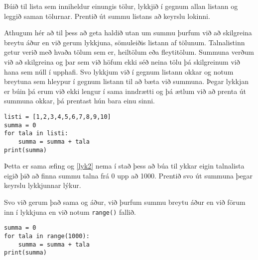 \begin{exercise}\label{lyk2}
Búið til lista sem inniheldur einungis tölur, lykkjið í gegnum allan listann og leggið saman tölurnar.
Prentið út summu listans að keyrslu lokinni.
\end{exercise}
\begin{Answer}[ref={lyk2}]
Athugum hér að til þess að geta haldið utan um summu þurfum við að skilgreina breytu áður en við gerum lykkjuna, sömuleiðis listann af tölunum.
Talnalistinn getur verið með hvaða tölum sem er, heiltölum eða fleytitölum.
Summuna verðum við að skilgreina og þar sem við höfum ekki séð neina tölu þá skilgreinum við hana sem núll í upphafi.
Svo lykkjum við í gegnum listann okkar og notum breytuna sem hleypur í gegnum listann til að bæta við summuna.
Þegar lykkjan er búin þá erum við ekki lengur í sama inndrætti og þá ætlum við að prenta út summuna okkar, þá prentast hún bara einu sinni.
 
\begin{lstlisting}
listi = [1,2,3,4,5,6,7,8,9,10]
summa = 0
for tala in listi:
	summa = summa + tala
print(summa)\end{lstlisting}
\end{Answer}

\begin{exercise}\label{lyk3}
Þetta er sama æfing og \ref{lyk2} nema í stað þess að búa til ykkar eigin talnalista eigið þið að finna summu talna frá 0 upp að 1000.
Prentið svo út summuna þegar keyrslu lykkjunnar lýkur.
\end{exercise}
\begin{Answer}[ref={lyk3}]
Svo við gerum það sama og áður, við þurfum summu breytu áður en við förum inn í lykkjuna en við notum \texttt{range()} fallið.
	
\begin{lstlisting}
summa = 0
for tala in range(1000):
	summa = summa + tala
print(summa)\end{lstlisting}
\end{Answer}

